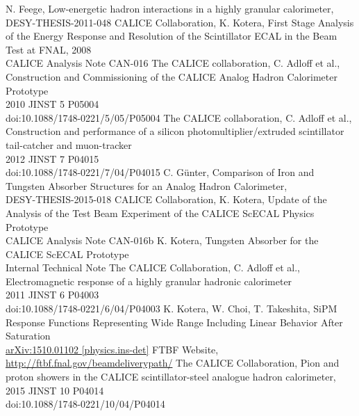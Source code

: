 \documentclass[twoside,a4paper,12pt]{article}
\begin{document}
\begin{thebibliography}{----------------}
	N. Feege, Low-energetic hadron interactions in a highly granular calorimeter, \\
	DESY-THESIS-2011-048
	CALICE Collaboration, K. Kotera, First Stage Analysis of the Energy Response and Resolution of the Scintillator ECAL in the Beam Test at FNAL, 2008 \\
	CALICE Analysis Note CAN-016
	The CALICE collaboration, C. Adloff et al., Construction and Commissioning of the CALICE Analog Hadron Calorimeter Prototype\\
	2010 JINST 5 P05004\\
 	doi:10.1088/1748-0221/5/05/P05004
	The CALICE collaboration, C. Adloff et al., Construction and performance of a silicon photomultiplier/extruded scintillator tail-catcher and muon-tracker\\
	2012 JINST 7 P04015\\
 	doi:10.1088/1748-0221/7/04/P04015
	C. G\"unter, Comparison of Iron and Tungsten Absorber Structures for an Analog Hadron Calorimeter, \\
	DESY-THESIS-2015-018
	CALICE Collaboration, K. Kotera, Update of the Analysis of the Test Beam Experiment of the CALICE ScECAL Physics Prototype\\
	CALICE Analysis Note CAN-016b
	K. Kotera, Tungsten Absorber for the CALICE ScECAL Prototype\\
	Internal Technical Note
	The CALICE Collaboration, C. Adloff et al., Electromagnetic response of a highly granular hadronic calorimeter\\
	2011 JINST 6 P04003 \\
	doi:10.1088/1748-0221/6/04/P04003
	K. Kotera, W. Choi, T. Takeshita, SiPM Response Functions Representing Wide Range Including Linear Behavior After Saturation\\
	 \href{http://arxiv.org/abs/1510.01102}{arXiv:1510.01102 [physics.ins-det]}
	FTBF Website, \\
	\href{http://ftbf.fnal.gov/beam-delivery-path/}{http://ftbf.fnal.gov/beam\-delivery\-path/}
	The CALICE Collaboration, Pion and proton showers in the CALICE scintillator-steel analogue hadron calorimeter, \\
	2015 JINST 10 P04014\\
	doi:10.1088/1748-0221/10/04/P04014

\end{thebibliography}
\end{document}
